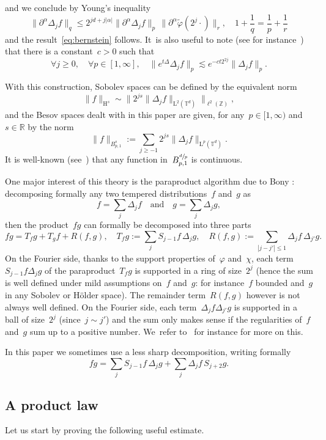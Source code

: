 \documentclass[JEP,XML,SOM,Unicode,published]{cedram}
\theoremstyle{definition}
\newcommand\R{\mathbb{R}}
\newcommand\T{\mathbb{T}}
\renewcommand\H{\mathrm{H}}
\renewcommand\L{\mathrm{L}}
\begin{document}
and we conclude by Young's inequality
\[
\big\|\partial^\alpha \Delta_j f \big\|_{q} \leq 2^{jd+j|\alpha|}\bigl\|\partial^\alpha \Delta_j f \bigr\|_{p}\,
\bigl\| \partial^\alpha\widetilde\varphi (2^j \cdot) \bigr\|_{r}, \quad 1+\frac1q = \frac1p+ \frac1r
\]
and the result~\eqref{eq:bernstein}
follows. It~is also useful to note (see for instance~\cite[Lem.\,2.4]{BCD}) that there is a constant~$c>0$ such that
\begin{equation}\label{eq:heat}
\forall j \geq 0, \quad \forall p\in[1,\infty], \quad \big\|e^{t\Delta} \Delta_j f \big\|_{p} \lesssim e^{-ct 2^{2j}} \big\|\Delta_j f\big\|_{p}.
\end{equation}

With this construction, Sobolev spaces can be defined by the equivalent norm
\[
\|f\|_{\H^s }\sim \Big\| 2^{js} \| \Delta_j f\|_{\L^2(\T^d)} \Big\|_{\ell^2(\mathbb Z)},
\]
and the Besov spaces dealt with in this paper are given, for any~$p \in [1,\infty)$ and~$s \in \R$ by the norm
\[
\|f\|_{B^s_{p,1}}:= \sum_{j \geq -1} 2^{js} \|\Delta_j f\|_{\L^p(\T^d)}.
\]
It is well-known (see~\cite{BCD}) that any function in~$B^{\sfrac dp}_{p,1}$ is continuous.

One major interest of this theory is the paraproduct algorithm due to Bony \cite{bony}: decomposing formally any two tempered distributions~$f$ and~$g$ as
\[
f = \sum_{j } \Delta_j f \quad \text{and} \quad g = \sum_{j } \Delta_j g,
\]
then the product~$fg$ can formally be decomposed into three parts
\[
fg= T_fg+T_gf+R(f,g), \quad T_fg:=\sum_{j }S_{j-1} f \,\Delta_j g, \quad R(f,g):=\sum_{|j-j'|\leq 1 } \Delta_j f \,\Delta_{j'}g.
\]
On the Fourier side, thanks to the support properties of~$\varphi$ and~$\chi$, each term~$S_{j-1} f \Delta_j g$ of the paraproduct~$ T_fg$ is supported in a ring of size~$2^j$ (hence the sum is well defined under mild assumptions on~$f$ and~$g$: for instance~$f$ bounded and~$g$ in any Sobolev or H\"older space). The remainder term~$ R(f,g)$ however is not always well defined. On the Fourier side, each term~$ \Delta_j f \Delta_{j'}g$ is supported in a ball of size~$2^j$ (since~$j \sim j'$) and the sum only makes sense if the regularities of~$f$ and~$g$ sum up to a positive number. We~refer to~\cite{BCD} for instance for more on this.

In this paper we sometimes use a less sharp decomposition, writing formally
\[
fg= \sum_{j }S_{j-1} f \,\Delta_j g + \sum_{j }\Delta_j f \, S_{j+2}g.
\]

\subsection{A product law}
Let us start by proving the following useful estimate.
\end{document}
